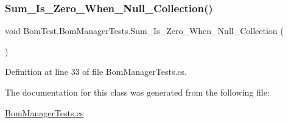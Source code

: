 \subsubsection{\texorpdfstring{Sum\+\_\+\+Is\+\_\+\+Zero\+\_\+\+When\+\_\+\+Null\+\_\+\+Collection()}{Sum\_Is\_Zero\_When\_Null\_Collection()}}
{\footnotesize\ttfamily void Bom\+Test.\+Bom\+Manager\+Tests.\+Sum\+\_\+\+Is\+\_\+\+Zero\+\_\+\+When\+\_\+\+Null\+\_\+\+Collection (\begin{DoxyParamCaption}{ }\end{DoxyParamCaption})\hspace{0.3cm}{\ttfamily [inline]}}



Definition at line 33 of file Bom\+Manager\+Tests.\+cs.



The documentation for this class was generated from the following file\+:\begin{DoxyCompactItemize}
\item 
\mbox{\hyperlink{_bom_manager_tests_8cs}{Bom\+Manager\+Tests.\+cs}}\end{DoxyCompactItemize}
